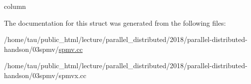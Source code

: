 column 

The documentation for this struct was generated from the following files\+:\begin{DoxyCompactItemize}
\item 
/home/tau/public\+\_\+html/lecture/parallel\+\_\+distributed/2018/parallel-\/distributed-\/handson/03spmv/\hyperlink{spmv_8cc}{spmv.\+cc}\item 
/home/tau/public\+\_\+html/lecture/parallel\+\_\+distributed/2018/parallel-\/distributed-\/handson/03spmv/spmvx.\+cc\end{DoxyCompactItemize}

